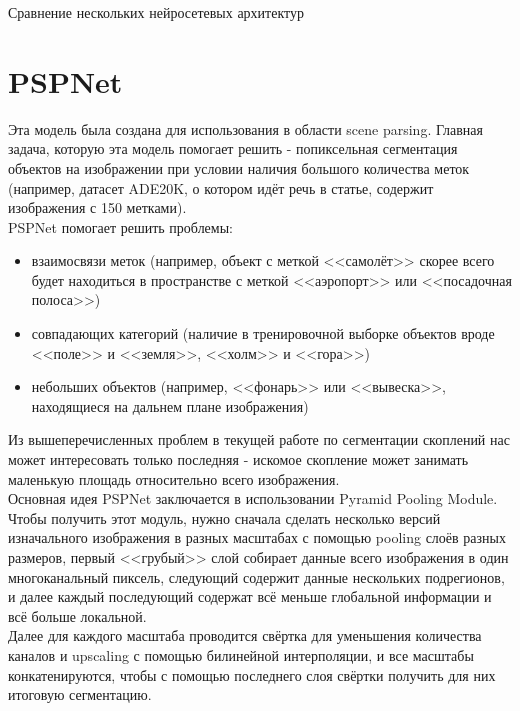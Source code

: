 \documentclass{article}
\begin{document}
\begin{center}{\huge Сравнение нескольких нейросетевых архитектур\\}\end{center}
\section{PSPNet}
Эта модель была создана для использования в области scene parsing. Главная задача, которую эта 
модель помогает решить - попиксельная сегментация объектов на изображении при условии наличия 
большого количества меток (например, датасет ADE20K, о котором идёт речь в статье, содержит 
изображения с 150 метками). \\

PSPNet помогает решить проблемы:\\
\begin{itemize}
    \item взаимосвязи меток (например, объект 
        с меткой <<самолёт>> скорее всего будет находиться в пространстве с меткой <<аэропорт>> или 
        <<посадочная полоса>>)\\
    \item совпадающих категорий (наличие в тренировочной выборке объектов вроде <<поле>> и <<земля>>, 
        <<холм>> и <<гора>>)\\
    \item небольших объектов (например, <<фонарь>> или <<вывеска>>, находящиеся на дальнем плане 
        изображения)\\
\end{itemize}

Из вышеперечисленных проблем в текущей работе по сегментации скоплений нас может интересовать только 
последняя - искомое скопление может занимать маленькую площадь относительно всего изображения.\\

Основная идея PSPNet заключается в использовании Pyramid Pooling Module. Чтобы получить этот модуль, 
нужно сначала сделать несколько версий изначального изображения в разных масштабах с помощью pooling 
слоёв разных размеров, первый <<грубый>> слой собирает данные всего изображения в один многоканальный 
пиксель, следующий содержит данные нескольких подрегионов, и далее каждый последующий содержат всё 
меньше глобальной информации и всё больше локальной. \\

Далее для каждого масштаба проводится свёртка для уменьшения количества каналов и upscaling с помощью 
билинейной интерполяции, и все масштабы конкатенируются, чтобы с помощью последнего слоя свёртки 
получить для них итоговую сегментацию. \\
\end{document}
